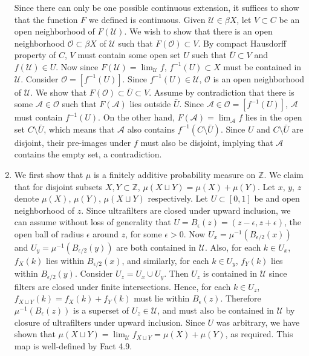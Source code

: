 \documentclass{article}
\begin{document}
\begin{enumerate}
    Since there can only be one possible continuous extension, it suffices
    to show that the function $F$ we defined is continuous. Given
    $\mathcal{U}\in\beta X$, let $V\subset C$ be an open neighborhood of
    $F(\mathcal{U})$. We wish to show that there is an open neighborhood
    $\mathcal{O}\subset\beta X$ of $\mathcal{U}$ such that
    $F(\mathcal{O})\subset V$. By compact Hausdorff property of $C$, $V$
    must contain some open set $U$ such that $\bar{U}\subset V$ and
    $f(\mathcal{U})\in U$. Now since $F(\mathcal{U})=\lim_{\mathcal{U}}f$,
    $f^{-1}(U)\subset X$ must be contained in $\mathcal{U}$. Consider
    $\mathcal{O}=[f^{-1}(U)]$. Since $f^{-1}(U)\in\mathcal{U}$,
    $\mathcal{O}$ is an open neighborhood of $\mathcal{U}$. We show that
    $F(\mathcal{O})\subset\bar{U}\subset V$. Assume by contradiction that
    there is some $\mathcal{A}\in\mathcal{O}$ such that $F(\mathcal{A})$
    lies outside $\bar{U}$. Since $\mathcal{A}\in\mathcal{O}=[f^{-1}(U)]$,
    $\mathcal{A}$ must contain $f^{-1}(U)$. On the other hand,
    $F(\mathcal{A})=\lim_{\mathcal{A}}f$ lies in the open set
    $C\setminus\bar{U}$, which means that $\mathcal{A}$ also contains
    $f^{-1}(C\setminus\bar{U})$. Since $U$ and $C\setminus\bar{U}$ are
    disjoint, their pre-images under $f$ must also be disjoint, implying
    that $\mathcal{A}$ contains the empty set, a contradiction.

  \item We first show that $\mu$ is a finitely additive probability
    measure on $\mathbb{Z}$. We claim that for disjoint subsets
    $X,Y\subset\mathbb{Z}$, $\mu(X\sqcup Y)=\mu(X)+\mu(Y)$. Let $x$, $y$,
    $z$ denote $\mu(X)$, $\mu(Y)$, $\mu(X\sqcup Y)$ respectively. Let
    $U\subset[0,1]$ be and open neighborhood of $z$. Since ultrafilters are
    closed under upward inclusion, we can assume without loss of generality
    that $U=B_\epsilon(z)=(z-\epsilon,z+\epsilon)$, the open ball of radius
    $\epsilon$ around $z$, for some $\epsilon>0$. Now
    $U_x=\mu^{-1}(B_{\epsilon/2}(x))$ and $U_y=\mu^{-1}(B_{\epsilon/2}(y))$
    are both contained in $\mathcal{U}$. Also, for each $k\in U_x$,
    $f_X(k)$ lies within $B_{\epsilon/2}(x)$, and similarly, for each $k\in
    U_y$, $f_Y(k)$ lies within $B_{\epsilon/2}(y)$. Consider $U_z=U_x\cup
    U_y$. Then $U_z$ is contained in $\mathcal{U}$ since filters are closed
    under finite intersections. Hence, for each $k\in U_z$, $f_{X\sqcup
    Y}(k)=f_X(k)+f_Y(k)$ must lie within $B_\epsilon(z)$. Therefore
    $\mu^{-1}(B_\epsilon(z))$ is a superset of $U_z\in\mathcal{U}$, and must
    also be contained in $\mathcal{U}$ by closure of ultrafilters under
    upward inclusion. Since $U$ was arbitrary, we have shown that
    $\mu(X\sqcup Y)=\lim_\mathcal{U}f_{X\sqcup Y}=\mu(X)+\mu(Y)$, as
    required. This map is well-defined by Fact 4.9. \\


\end{enumerate}
\end{document}
